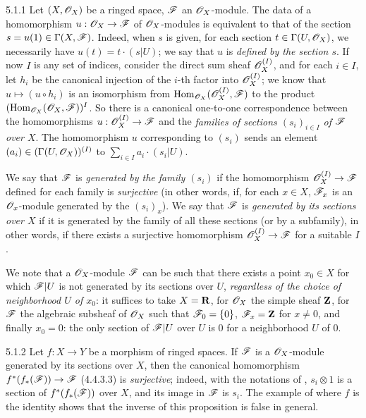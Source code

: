 \begin{env}{5.1.1}
\label{env-0.5.1.1}
Let $(X,\mathscr{O}_X)$ be a ringed space, $\mathscr{F}$ an $\mathscr{O}_X$-module. The data of a homomorphism
$u:\mathscr{O}_X\to\mathscr{F}$ of $\mathscr{O}_X$-modules is equivalent to that of the section
$s=u(1)\in\Gamma(X,\mathscr{F})$. Indeed, when $s$ is given, for each section
$t\in\Gamma(U,\mathscr{O}_X)$, we necessarily have $u(t)=t\cdot(s|U)$; we say that $u$ is
\emph{defined by the section $s$}. If now $I$ is any set of indices, consider the direct
sum sheaf $\mathscr{O}_X^{(I)}$, and for each $i\in I$, let $h_i$ be the canonical injection of
the $i$-th factor into $\mathscr{O}_X^{(I)}$; we know that $u\mapsto(u\circ h_i)$ is an isomorphism
from ${\mathop{\mathrm{Hom}}\nolimits}_{\mathscr{O}_X}(\mathscr{O}_X^{(I)},\mathscr{F})$ to the product $({\mathop{\mathrm{Hom}}\nolimits}_{\mathscr{O}_X}(\mathscr{O}_X,\mathscr{F}))^I$. So
there is a canonical one-to-one correspondence between the homomorphisms
$u:\mathscr{O}_X^{(I)}\to\mathscr{F}$ and the \emph{families of sections $(s_i)_{i\in I}$ of $\mathscr{F}$ over
$X$}. The homomorphism $u$ corresponding to $(s_i)$ sends an element
$(a_i)\in(\Gamma(U,\mathscr{O}_X))^{(I)}$ to $\sum_{i\in I}a_i\cdot(s_i|U)$.

We say that $\mathscr{F}$ is \emph{generated by the family $(s_i)$} if the homomorphism
$\mathscr{O}_X^{(I)}\to\mathscr{F}$ defined
for each family is \emph{surjective} (in other words, if, for each $x\in X$, $\mathscr{F}_x$ is an
$\mathscr{O}_x$-module generated by the $(s_i)_x$). We say that $\mathscr{F}$ is \emph{generated by its
sections over $X$} if it is generated by the family of all these sections (or by a
subfamily), in other words, if there exists a surjective homomorphism $\mathscr{O}_X^{(I)}\to\mathscr{F}$
for a suitable $I$.

We note that a $\mathscr{O}_X$-module $\mathscr{F}$ can be such that there exists a point $x_0\in X$ for
which $\mathscr{F}|U$ is not generated by its sections over $U$, \emph{regardless of the choice
of neighborhood $U$ of $x_0$}: it suffices to take $X=\mathbf{R}$, for $\mathscr{O}_X$ the simple sheaf
$\mathbf{Z}$, for $\mathscr{F}$ the algebraic subsheaf of $\mathscr{O}_X$ such that $\mathscr{F}_0=\{0\}$,
$\mathscr{F}_x=\mathbf{Z}$ for $x\neq 0$, and finally $x_0=0$: the only section of $\mathscr{F}|U$ over $U$ 
is $0$ for a neighborhood $U$ of $0$.
\end{env}

\begin{env}{5.1.2}
\label{env-0.5.1.2}
Let $f:X\to Y$ be a morphism of ringed spaces. If $\mathscr{F}$ is a $\mathscr{O}_X$-module generated by
its sections over $X$, then the canonical homomorphism $f^*(f_*(\mathscr{F}))\to\mathscr{F}$ (4.4.3.3)
is \emph{surjective}; indeed, with the notations of , $s_i\otimes 1$ is a
section of $f^*(f_*(\mathscr{F}))$ over $X$, and its image in $\mathscr{F}$ is $s_i$. The example of
 where $f$ is the identity shows that the inverse of this proposition is
false in general.
\end{env}

